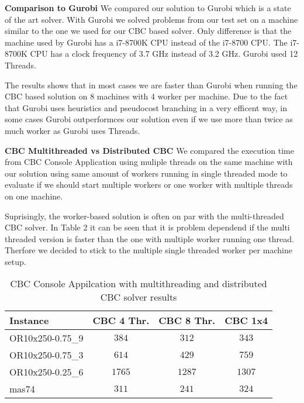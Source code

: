 \documentclass[sigconf]{acmart}
\begin{document}
\textbf{Comparison to Gurobi}
We compared our solution to Gurobi which is a state of the art solver. With Gurobi we solved problems from our test set on a machine similar to the one we used for our CBC based solver. Only difference is that the machine used by Gurobi has a i7-8700K CPU instead of the i7-8700 CPU. The i7-8700K CPU has a clock frequency of 3.7 GHz instead of 3.2 GHz. Gurobi used 12 Threads. 

The results shows that in most cases we are faster than Gurobi when running the CBC based solution on 8 machines with 4 worker per machine. Due to the fact that Gurobi uses heuristics and pseudocost branching in a very efficent way, in some cases Gurobi outperformces our solution even if we use more than twice as much worker as Gurobi uses Threads. 

\textbf{CBC Multithreaded vs Distributed CBC}
We compared the execution time from CBC Console Application using muliple threads on the same machine with our solution using same amount of workers running in single threaded mode to evaluate if we should start multiple workers or one worker with multiple threads on one machine.

Suprisingly, the worker-based solution is often on par with the multi-threaded CBC solver. In Table 2 it can be seen that it is problem dependend if the multi threaded version is faster than the one with multiple worker running one thread. Therfore we decided to stick to the multiple single threaded worker per machine setup.

\begin{table}
\caption{CBC Console Appilcation with multithreading and distributed CBC solver results}

\begin{tabular}{|l || c | c| c |} 
 \hline
 Instance & CBC 4 Thr. & CBC 8 Thr. & CBC 1x4  \\  
 \hline
 OR10x250-0.75\_9 & $384$ & $312$ & $343$ \\
 \hline
 OR10x250-0.75\_3 &$614$&$429$ & $759$\\
 \hline
 OR10x250-0.25\_6& $1765$& $1287$ & $1307$\\
 \hline
 mas74 & $311$&$241$&$324$ \\
 \hline
\end{tabular}
\end{table}
\end{document}

